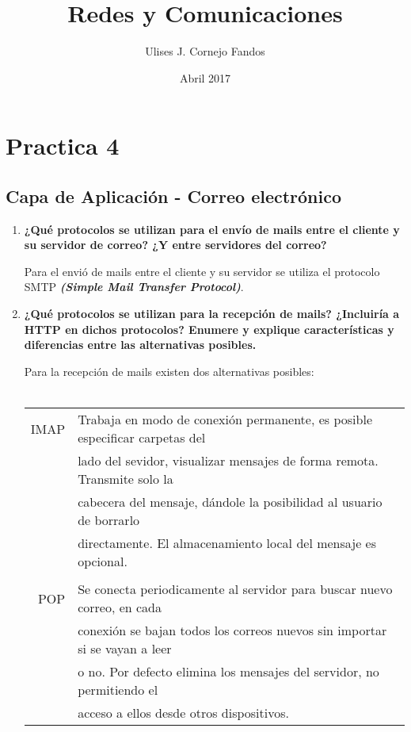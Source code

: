 \documentclass[a4paper,10pt]{article}
\title{Redes y Comunicaciones}
\author{Ulises J. Cornejo Fandos}
\date{Abril 2017}
\begin{document}
\maketitle

\section{Practica 4}
\subsection{Capa de Aplicación - Correo electrónico}

\begin{enumerate}
    \item \textbf{¿Qué protocolos se utilizan para el envío de mails entre el cliente y su servidor de correo? ¿Y entre servidores del correo?}
   
    Para el envió de mails entre el cliente y su servidor se utiliza el protocolo SMTP \textbf{\textit{(Simple Mail Transfer Protocol)}}. \\
   
   
   \item \textbf{¿Qué protocolos se utilizan para la recepción de mails? ¿Incluiría a HTTP en dichos protocolos? Enumere y explique características y diferencias entre las alternativas posibles.}
   
   Para la recepción de mails existen dos alternativas posibles: \\ \\
    \begin{tabular}{r|l}
        IMAP & Trabaja en modo de conexión permanente, es posible especificar carpetas del \\
             & lado del sevidor, visualizar mensajes de forma remota. Transmite solo la \\ 
             & cabecera del mensaje, dándole la posibilidad al usuario de borrarlo \\ 
             & directamente. El almacenamiento local del mensaje es opcional.\\ \\
        POP & Se conecta periodicamente al servidor para buscar nuevo correo, en cada \\
            & conexión se bajan todos los correos nuevos sin importar si se vayan a leer \\ 
            & o no. Por defecto elimina los mensajes del servidor, no permitiendo el \\
            & acceso a ellos desde otros dispositivos.
    \end{tabular}
   

\end{enumerate}
\end{document}
